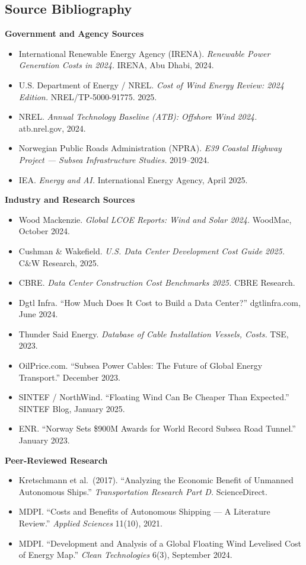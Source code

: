 \documentclass[11pt,letterpaper]{article}
\begin{document}
\subsection{Source Bibliography}

\textbf{Government and Agency Sources}
\begin{itemize}[itemsep=2pt]
  \item International Renewable Energy Agency (IRENA). \textit{Renewable Power Generation Costs in 2024.} IRENA, Abu Dhabi, 2024.
  \item U.S. Department of Energy / NREL. \textit{Cost of Wind Energy Review: 2024 Edition.} NREL/TP-5000-91775. 2025.
  \item NREL. \textit{Annual Technology Baseline (ATB): Offshore Wind 2024.} atb.nrel.gov, 2024.
  \item Norwegian Public Roads Administration (NPRA). \textit{E39 Coastal Highway Project --- Subsea Infrastructure Studies.} 2019--2024.
  \item IEA. \textit{Energy and AI.} International Energy Agency, April 2025.
\end{itemize}

\textbf{Industry and Research Sources}
\begin{itemize}[itemsep=2pt]
  \item Wood Mackenzie. \textit{Global LCOE Reports: Wind and Solar 2024.} WoodMac, October 2024.
  \item Cushman \& Wakefield. \textit{U.S. Data Center Development Cost Guide 2025.} C\&W Research, 2025.
  \item CBRE. \textit{Data Center Construction Cost Benchmarks 2025.} CBRE Research.
  \item Dgtl Infra. ``How Much Does It Cost to Build a Data Center?'' dgtlinfra.com, June 2024.
  \item Thunder Said Energy. \textit{Database of Cable Installation Vessels, Costs.} TSE, 2023.
  \item OilPrice.com. ``Subsea Power Cables: The Future of Global Energy Transport.'' December 2023.
  \item SINTEF / NorthWind. ``Floating Wind Can Be Cheaper Than Expected.'' SINTEF Blog, January 2025.
  \item ENR. ``Norway Sets \$900M Awards for World Record Subsea Road Tunnel.'' January 2023.
\end{itemize}

\textbf{Peer-Reviewed Research}
\begin{itemize}[itemsep=2pt]
  \item Kretschmann et al.\ (2017). ``Analyzing the Economic Benefit of Unmanned Autonomous Ships.'' \textit{Transportation Research Part D.} ScienceDirect.
  \item MDPI. ``Costs and Benefits of Autonomous Shipping --- A Literature Review.'' \textit{Applied Sciences} 11(10), 2021.
  \item MDPI. ``Development and Analysis of a Global Floating Wind Levelised Cost of Energy Map.'' \textit{Clean Technologies} 6(3), September 2024.
\end{itemize}
\end{document}
